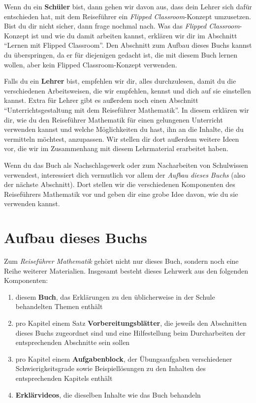 \documentclass[../main.tex]{subfiles}
\begin{document}
Wenn du ein \textbf{Schüler} bist, dann gehen wir davon aus, dass dein Lehrer sich dafür entschieden hat, mit dem Reiseführer ein \emph{Flipped Classroom}-Konzept umzusetzen. Bist du dir nicht sicher, dann frage nochmal nach. Was das \emph{Flipped Classroom}-Konzept ist und wie du damit arbeiten kannst, erklären wir dir im Abschnitt \enquote{Lernen mit Flipped Classroom}. Den Abschnitt zum Aufbau dieses Buchs kannst du überspringen, da er für diejenigen gedacht ist, die mit diesem Buch lernen wollen, aber kein Flipped Classroom-Konzept verwenden.

Falls du ein \textbf{Lehrer} bist, empfehlen wir dir, alles durchzulesen, damit du die verschiedenen Arbeitsweisen, die wir empfehlen, kennst und dich auf sie einstellen kannst. Extra für Lehrer gibt es außerdem noch einen Abschnitt \enquote{Unterrichtsgestaltung mit dem Reiseführer Mathematik}. In diesem erklären wir dir, wie du den Reiseführer Mathematik für einen gelungenen Unterricht verwenden kannst und welche Möglichkeiten du hast, ihn an die Inhalte, die du vermitteln möchtest, anzupassen. Wir stellen dir dort außerdem weitere Ideen vor, die wir im Zusammenhang mit diesem Lehrmaterial erarbeitet haben.

Wenn du das Buch als Nachschlagewerk oder zum Nacharbeiten von Schulwissen verwendest, interessiert dich vermutlich vor allem der \emph{Aufbau dieses Buchs} (also der nächste Abschnitt). Dort stellen wir die verschiedenen Komponenten des Reiseführers Mathematik vor und geben dir eine grobe Idee davon, wie du sie verwenden kannst.

\newpage
\section*{Aufbau dieses Buchs}
\label{concept}

Zum \emph{Reiseführer Mathematik} gehört nicht nur dieses Buch, sondern noch eine Reihe weiterer Materialien. Insgesamt besteht dieses Lehrwerk aus den folgenden Komponenten:
\begin{enumerate}
    \item diesem \textbf{Buch}, das Erklärungen zu den üblicherweise in der Schule behandelten Themen enthält
    \item pro Kapitel einem Satz \textbf{Vorbereitungsblätter}, die jeweils den Abschnitten dieses Buchs zugeordnet sind und eine Hilfestellung beim Durcharbeiten der entsprechenden Abschnitte sein sollen
    \item pro Kapitel einem \textbf{Aufgabenblock}, der Übungsaufgaben verschiedener Schwierigkeitsgrade sowie Beispiellösungen zu den Inhalten des entsprechenden Kapitels enthält
    \item \textbf{Erklärvideos}, die dieselben Inhalte wie das Buch behandeln
\end{enumerate}
\end{document}
